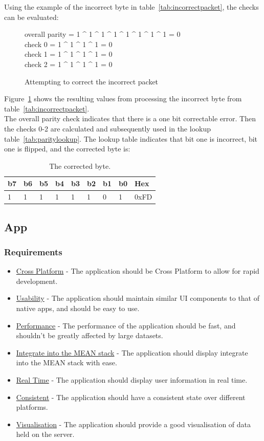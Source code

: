 \documentclass[preprint,12pt,3p]{elsarticle}
\begin{document}
Using the example of the incorrect byte in table~\ref{tab:incorrectpacket}, the checks can be evaluated:
\begin{figure}[H]
\centering
overall parity = 1 \^{} 1 \^{} 1 \^{} 1 \^{} 1 \^{} 1 \^{} 1 \^{} 1 = 0\\
check 0 = 1 \^{} 1 \^{} 1 \^{} 1 = 0\\
check 1 = 1 \^{} 1 \^{} 1 \^{} 1 = 0\\
check 2 = 1 \^{} 1 \^{} 1 \^{} 1 = 0\\
\caption{Attempting to correct the incorrect packet}
\label{fig:xorexample}
\end{figure}
Figure~\ref{fig:xorexample} shows the resulting values from processing the incorrect byte from table~\ref{tab:incorrectpacket}.\\
The overall parity check indicates that there is a one bit correctable error. Then the checks 0-2 are calculated and subsequently used in the lookup table~\ref{tab:paritylookup}. The lookup table indicates that bit one is incorrect, bit one is flipped, and the corrected byte is:
\begin{table}[H]
\centering
\begin{tabular}{| l | l | l | l | l | l | l | l | l |}
\hline
b7 & b6 & b5 & b4 & b3 & b2 & b1 & b0 & Hex\\ \hline
1 & 1 & 1 & 1 & 1 & 1 & 0 & 1  & 0xFD\\ \hline
\end{tabular}
\caption{The corrected byte.}
\label{tab:correctedbyte}
\end{table}

\subsection{App}
\subsubsection{Requirements}
\begin{itemize}
\item \underline{Cross Platform} - The application should be Cross Platform to allow for rapid development.
\item \underline{Usability} - The application should maintain similar UI components to that of native apps, and should be easy to use.
\item \underline{Performance} - The performance of the application should be fast, and shouldn't be greatly affected by large datasets.
\item \underline{Integrate into the MEAN stack} - The application should display integrate into the MEAN stack with ease.
\item \underline{Real Time} - The application should display user information in real time.
\item \underline{Consistent} - The application should have a consistent state over different platforms.
\item \underline{Visualisation} - The application should provide a good visualisation of data held on the server.
\end{itemize}
\end{document}
